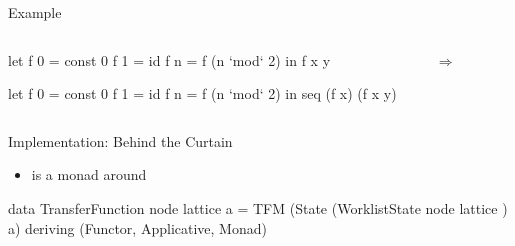 \documentclass{haskellbeamer}
\begin{document}
\begin{frame}[fragile]{Example}
  \begin{overprint}
    \begin{columns}
      \begin{column}{0.35\textwidth}
        \begin{overprint}
          \begin{haskell}
            let f 0 = const 0
                f 1 = id 
                f n = f (n `mod` 2)
            in f x y
          \end{haskell}
          \begin{haskell}
            let f 0 = const 0
                f 1 = id 
                f n = f (n `mod` 2)
            in seq (f x) (f x y)
          \end{haskell}
        \end{overprint}
      \end{column}
      \begin{column}{0.02\textwidth}
        {\Huge$\Rightarrow$}
      \end{column}
      \begin{column}{0.4\textwidth}
      \end{column}
    \end{columns}
  \end{overprint}
\end{frame}

\begin{frame}[fragile]{Implementation: Behind the Curtain}
  \begin{itemize}
    \item {} is a  monad around 
  \end{itemize}
  \begin{center}
    \begin{minipage}{0.8\textwidth}
      \begin{haskell}
        data TransferFunction node lattice a
          = TFM (State (WorklistState node lattice ) a)
          deriving (Functor, Applicative, Monad)
      \end{haskell}
    \end{minipage}
  \end{center}
\end{frame}
\end{document}

